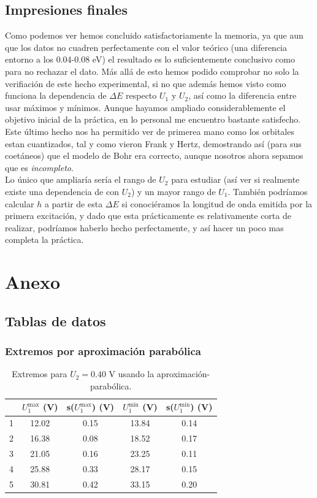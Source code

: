 \documentclass[12pt,a4paper]{article}
\numberwithin{equation}{section}
\numberwithin{figure}{section}
\begin{document}
\subsection{Impresiones finales}

Como podemos ver hemos concluido satisfactoriamente la memoria, ya que aun que los datos no cuadren perfectamente con el valor teórico (una diferencia entorno a los 0.04-0.08 eV) el resultado es lo suficientemente conclusivo como para no rechazar el dato. Más allá de esto hemos podido comprobar no solo la verifiación de este hecho experimental, si no que además hemos visto como funciona la dependencia de $\Delta E$ respecto $U_1$ y $U_2$, así como la diferencia entre usar máximos y mínimos. Aunque hayamos ampliado considerablemente el objetivo inicial de la práctica, en lo personal me encuentro bastante satisfecho. Este último hecho nos ha permitido ver de primerea mano como los orbitales estan cuantizados, tal y como vieron Frank y Hertz, demostrando así (para sus coetáneos) que el modelo de Bohr era correcto, aunque nosotros ahora sepamos que es \textit{incompleto}. \\

Lo único que ampliaría sería el rango de $U_2$ para estudiar (así ver si realmente existe una dependencia de con $U_2$) y un mayor rango de $U_1$. También podríamos calcular $h$ a partir de esta $\Delta E$ si conociéramos la longitud de onda emitida por la primera excitación, y dado que esta prácticamente es relativamente corta de realizar, podríamos haberlo hecho perfectamente, y así hacer un poco mas completa la práctica. 


\section{Anexo}
\subsection{Tablas de datos}
\subsubsection{Extremos por aproximación parabólica} \label{Subsubsec:6.1.1}

  
\begin{table}[h!] 	 \centering 
\begin{tabular}{ccccc}
\hline & $U_1^{\max}$ (V) & s($U_1^{\max}$) (V) & $U_1^{\min}$ (V) & s($U_1^{\min}$) (V) \\
\hline
 1 & 12.02 & 0.15 & 13.84 & 0.14 \\
 2 & 16.38 & 0.08 & 18.52 & 0.17 \\
 3 & 21.05 & 0.16 & 23.25 & 0.11 \\
 4 & 25.88 & 0.33 & 28.17 & 0.15 \\
 5 & 30.81 & 0.42 & 33.15 & 0.20 \\
\hline
\end{tabular}\caption{Extremos para $U_2=0.40$ V usando la aproximación-parabólica.} 
\label{Tab:parabolas-1} 
\end{table} 
 
\end{document}
